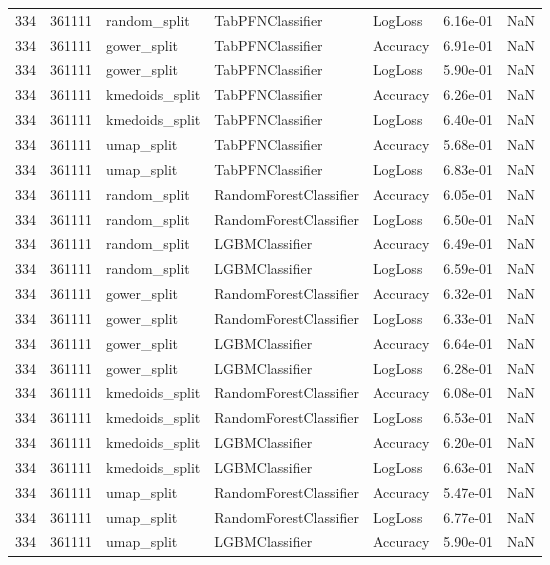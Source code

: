 \begin{tabular}{rrlllrr}
334 & 361111 & random\_split & TabPFNClassifier & LogLoss & 6.16e-01 & NaN \\
334 & 361111 & gower\_split & TabPFNClassifier & Accuracy & 6.91e-01 & NaN \\
334 & 361111 & gower\_split & TabPFNClassifier & LogLoss & 5.90e-01 & NaN \\
334 & 361111 & kmedoids\_split & TabPFNClassifier & Accuracy & 6.26e-01 & NaN \\
334 & 361111 & kmedoids\_split & TabPFNClassifier & LogLoss & 6.40e-01 & NaN \\
334 & 361111 & umap\_split & TabPFNClassifier & Accuracy & 5.68e-01 & NaN \\
334 & 361111 & umap\_split & TabPFNClassifier & LogLoss & 6.83e-01 & NaN \\
334 & 361111 & random\_split & RandomForestClassifier & Accuracy & 6.05e-01 & NaN \\
334 & 361111 & random\_split & RandomForestClassifier & LogLoss & 6.50e-01 & NaN \\
334 & 361111 & random\_split & LGBMClassifier & Accuracy & 6.49e-01 & NaN \\
334 & 361111 & random\_split & LGBMClassifier & LogLoss & 6.59e-01 & NaN \\
334 & 361111 & gower\_split & RandomForestClassifier & Accuracy & 6.32e-01 & NaN \\
334 & 361111 & gower\_split & RandomForestClassifier & LogLoss & 6.33e-01 & NaN \\
334 & 361111 & gower\_split & LGBMClassifier & Accuracy & 6.64e-01 & NaN \\
334 & 361111 & gower\_split & LGBMClassifier & LogLoss & 6.28e-01 & NaN \\
334 & 361111 & kmedoids\_split & RandomForestClassifier & Accuracy & 6.08e-01 & NaN \\
334 & 361111 & kmedoids\_split & RandomForestClassifier & LogLoss & 6.53e-01 & NaN \\
334 & 361111 & kmedoids\_split & LGBMClassifier & Accuracy & 6.20e-01 & NaN \\
334 & 361111 & kmedoids\_split & LGBMClassifier & LogLoss & 6.63e-01 & NaN \\
334 & 361111 & umap\_split & RandomForestClassifier & Accuracy & 5.47e-01 & NaN \\
334 & 361111 & umap\_split & RandomForestClassifier & LogLoss & 6.77e-01 & NaN \\
334 & 361111 & umap\_split & LGBMClassifier & Accuracy & 5.90e-01 & NaN \\

\end{tabular}
